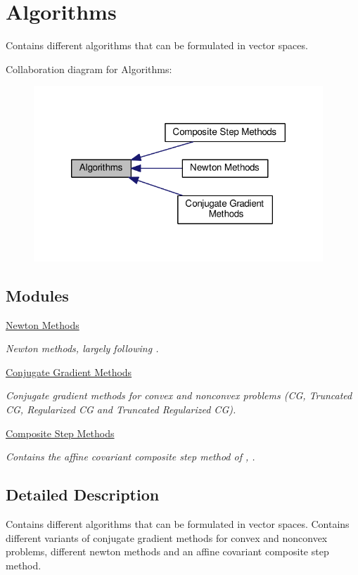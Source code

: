 \hypertarget{group__AlgorithmGroup}{\section{Algorithms}
\label{group__AlgorithmGroup}
}


Contains different algorithms that can be formulated in vector spaces.  


Collaboration diagram for Algorithms\-:
\nopagebreak
\begin{figure}[H]
\begin{center}
\leavevmode
\includegraphics[width=308pt]{group__AlgorithmGroup}
\end{center}
\end{figure}
\subsection*{Modules}
\begin{DoxyCompactItemize}
\item 
\hyperlink{group__NewtonGroup}{Newton Methods}
\begin{DoxyCompactList}\small\item\em Newton methods, largely following \cite{Deuflhard2004}. \end{DoxyCompactList}\item 
\hyperlink{group__CGGroup}{Conjugate Gradient Methods}
\begin{DoxyCompactList}\small\item\em Conjugate gradient methods for convex and nonconvex problems (C\-G, Truncated C\-G, Regularized C\-G and Truncated Regularized C\-G). \end{DoxyCompactList}\item 
\hyperlink{group__CSGroup}{Composite Step Methods}
\begin{DoxyCompactList}\small\item\em Contains the affine covariant composite step method of \cite{Lubkoll2015}, \cite{Lubkoll2015a}. \end{DoxyCompactList}\end{DoxyCompactItemize}


\subsection{Detailed Description}
Contains different algorithms that can be formulated in vector spaces. Contains different variants of conjugate gradient methods for convex and nonconvex problems, different newton methods and an affine covariant composite step method. 